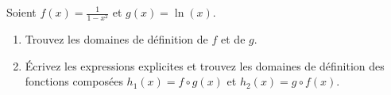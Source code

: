 
\begin{exercice}\label{exoDS_2010_2bis}

Soient $\displaystyle f(x)= \frac{1}{1-x^2}$ et $\displaystyle g(x)=\ln(x)$. 

\begin{enumerate}
\item Trouvez les domaines de définition de $f$ et de $g$.
\item Écrivez les expressions explicites et trouvez les domaines de définition des fonctions composées $h_1 (x) = f\circ g (x)$ et $h_2(x)=g\circ f (x)$.
\end{enumerate}
 
 
  
\end{exercice}
